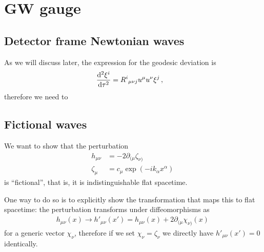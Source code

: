 \documentclass[main.tex]{subfiles}
\begin{document}
\section{GW gauge}

\subsection{Detector frame Newtonian waves}



As we will discuss later, the expression for the geodesic deviation is 
%
\begin{align}
\dv[2]{\xi^{i}}{\tau } &= R^{i}{}_{\mu \nu j} u^{\mu} u^{\nu } \xi^{j}
\,,
\end{align}
%
therefore we need to 

\subsection{Fictional waves}

We want to show that the perturbation 
%
\begin{align}
h_{\mu \nu } &= - 2 \partial_{(\mu } \zeta_{\nu )}  \\
\zeta_{\mu } &= c_\mu \exp( - i k_\alpha x^{\alpha })
\,
\end{align}
%
is ``fictional'', that is, it is indistinguishable flat spacetime.

One way to do so is to explicitly show the transformation that maps this to flat spacetime: the perturbation transforms under diffeomorphisms as 
%
\begin{align}
h_{\mu \nu } (x) \to h'_{\mu \nu } (x') = h_{\mu \nu } (x) + 2 \partial_{(\mu } \chi_{\nu )} (x)
\,
\end{align}
%
for a generic vector \(\chi_{\nu }\), therefore if we set \(\chi _\nu = \zeta _\nu \) we directly have \(h'_{\mu \nu } (x') = 0\) identically.
\end{document}
